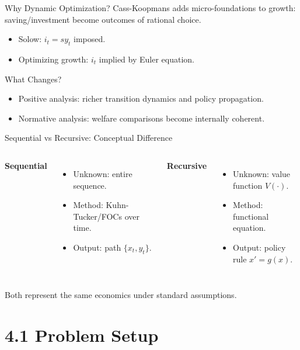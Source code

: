 \documentclass[aspectratio=169,10pt]{beamer}
\begin{document}
\begin{frame}{Why Dynamic Optimization?}
Cass-Koopmans adds micro-foundations to growth: saving/investment become outcomes of rational choice.

\medskip
\begin{itemize}
  \item Solow: $i_t=s y_t$ imposed.
  \item Optimizing growth: $i_t$ implied by Euler equation.
\end{itemize}

\begin{block}{What Changes?}
\begin{itemize}
  \item Positive analysis: richer transition dynamics and policy propagation.
  \item Normative analysis: welfare comparisons become internally coherent.
\end{itemize}
\end{block}
\end{frame}

\begin{frame}{Sequential vs Recursive: Conceptual Difference}
\begin{columns}[T]
\textbf{Sequential}
\begin{itemize}
  \item Unknown: entire sequence.
  \item Method: Kuhn-Tucker/FOCs over time.
  \item Output: path $\{x_t,y_t\}$.
\end{itemize}

\textbf{Recursive}
\begin{itemize}
  \item Unknown: value function $V(\cdot)$.
  \item Method: functional equation.
  \item Output: policy rule $x'=g(x)$.
\end{itemize}
\end{columns}

\medskip
Both represent the same economics under standard assumptions.
\end{frame}

\section{4.1 Problem Setup}
\end{document}
